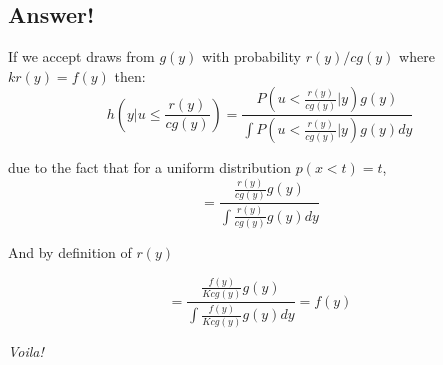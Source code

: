 \documentclass[a4paper,11pt]{article}
\begin{document}
\subsection*{Answer!}

If we accept draws from $g(y)$ with probability $r(y)/cg(y)$ where $kr(y)=f(y)$ then:
\[
h\left(y|u\leq\frac{r(y)}{cg(y)}\right) = \frac{P\left(u<\frac{r(y)}{cg(y)}|y\right)g(y)}{\int P\left(u<\frac{r(y)}{cg(y)}|y\right)g(y)dy}
\]

due to the fact that for a uniform distribution $p(x<t)=t$,
\[
  =\frac{\frac{r(y)}{cg(y)}g(y)}{\int \frac{r(y)}{cg(y)}g(y)dy}
\]

And by definition of $r(y)$

\[
  =\frac{\frac{f(y)}{Kcg(y)}g(y)}{\int \frac{f(y)}{Kcg(y)}g(y)dy} = f(y)
\]

\emph{Voila!}
\end{document}
